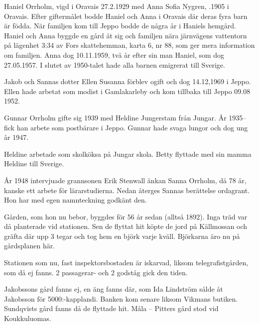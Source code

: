 Haniel Orrholm, vigd i Oravais 27.2.1929 med Anna Sofia Nygren, .1905 i Oravais. Efter giftermålet bodde Haniel och Anna i Oravais där deras fyra barn är födda. När familjen kom till Jeppo bodde de några år i Haniels hemgård. Haniel och Anna byggde en gård åt sig och familjen nära järnvägens vattentorn på lägenhet 3:34 av Fors skattehemman, karta 6, nr 88, som ger mera information om familjen. Anna dog 10.11.1959, två år efter sin man Haniel, som dog 27.05.1957. I slutet av 1950-talet hade alla barnen emigrerat till Sverige.

Jakob och Sannas dotter Ellen Susanna förblev ogift och dog 14.12,1969 i Jeppo. Ellen hade arbetat som modist i Gamlakarleby och kom tillbaka till Jeppo 09.08 1952.

Gunnar Orrholm gifte sig 1939 med Heldine Jungerstam från Jungar. År 1935-- fick han arbete som postbärare i Jeppo. Gunnar hade svaga lungor och dog ung år 1947.
\begin{jhchildren}
  \item {}
  \item {}
\end{jhchildren}
Heldine arbetade som skolköksa på Jungar skola. Betty flyttade med sin mamma Heldine till Sverige.



År 1948 intervjuade grannsonen Erik Stenwall änkan Sanna Orrholm, då 78 år, kanske ett arbete för lärarstudierna. Nedan återges Sannas berättelse ordagrant. Hon har med egen namnteckning godkänt den.


Gården, som hon nu bebor, byggdes för 56 år sedan (alltså 1892). Inga träd var då planterade vid stationen. Sen de flyttat hit köpte de jord på Källmossan och gräfta där upp 3 tegar och tog hem en björk varje kväll. Björkarna äro nu på gårdsplanen här.

Stationen som nu, fast inspektorsbostaden är iskarvad, liksom telegrafistgården, som då ej fanns. 2 passagerar- och 2 godståg gick den tiden.

Jakobssons gård fanns ej, en äng fanns där, som Ida Lindström sålde åt Jakobsson för 5000:-kapplandi. Banken kom senare liksom Vikmans butiken. Sundqvists gård fanns då de flyttade hit. Måla – Pitters gård stod vid Koukkuluomas.

